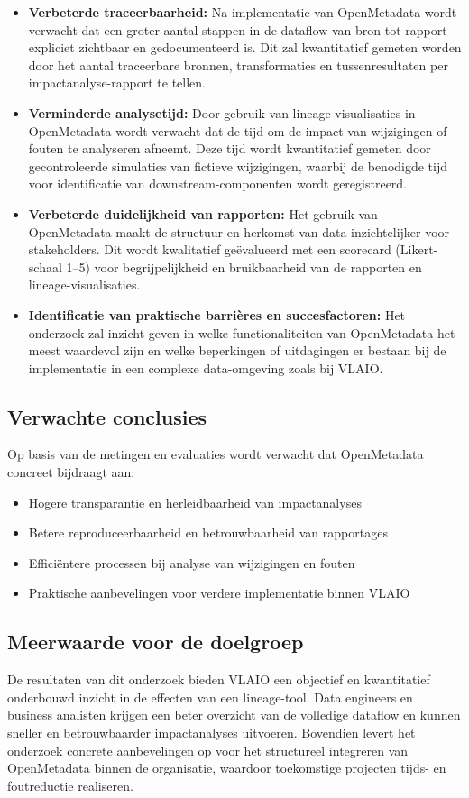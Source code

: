 \begin{itemize}
    \item \textbf{Verbeterde traceerbaarheid:} Na implementatie van OpenMetadata wordt verwacht dat een groter aantal stappen in de dataflow van bron tot rapport expliciet zichtbaar en gedocumenteerd is. Dit zal kwantitatief gemeten worden door het aantal traceerbare bronnen, transformaties en tussenresultaten per impactanalyse-rapport te tellen.
    
    \item \textbf{Verminderde analysetijd:} Door gebruik van lineage-visualisaties in OpenMetadata wordt verwacht dat de tijd om de impact van wijzigingen of fouten te analyseren afneemt. Deze tijd wordt kwantitatief gemeten door gecontroleerde simulaties van fictieve wijzigingen, waarbij de benodigde tijd voor identificatie van downstream-componenten wordt geregistreerd.
    
    \item \textbf{Verbeterde duidelijkheid van rapporten:} Het gebruik van OpenMetadata maakt de structuur en herkomst van data inzichtelijker voor stakeholders. Dit wordt kwalitatief geëvalueerd met een scorecard (Likert-schaal 1--5) voor begrijpelijkheid en bruikbaarheid van de rapporten en lineage-visualisaties.
    
    \item \textbf{Identificatie van praktische barrières en succesfactoren:} Het onderzoek zal inzicht geven in welke functionaliteiten van OpenMetadata het meest waardevol zijn en welke beperkingen of uitdagingen er bestaan bij de implementatie in een complexe data-omgeving zoals bij VLAIO.
\end{itemize}

\subsection*{Verwachte conclusies}
Op basis van de metingen en evaluaties wordt verwacht dat OpenMetadata concreet bijdraagt aan:
\begin{itemize}
    \item Hogere transparantie en herleidbaarheid van impactanalyses
    \item Betere reproduceerbaarheid en betrouwbaarheid van rapportages
    \item Efficiëntere processen bij analyse van wijzigingen en fouten
    \item Praktische aanbevelingen voor verdere implementatie binnen VLAIO
\end{itemize}

\subsection*{Meerwaarde voor de doelgroep}
De resultaten van dit onderzoek bieden VLAIO een objectief en kwantitatief onderbouwd inzicht in de effecten van een lineage-tool. Data engineers en business analisten krijgen een beter overzicht van de volledige dataflow en kunnen sneller en betrouwbaarder impactanalyses uitvoeren. Bovendien levert het onderzoek concrete aanbevelingen op voor het structureel integreren van OpenMetadata binnen de organisatie, waardoor toekomstige projecten tijds- en foutreductie realiseren.
